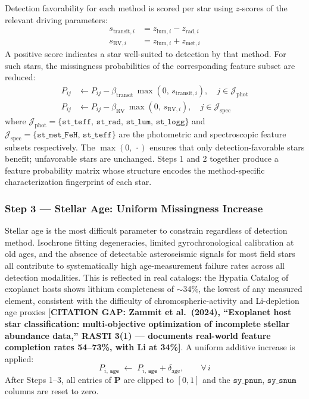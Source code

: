 \documentclass[preprint]{aastex631}
\begin{document}
Detection favorability for each method is scored per star using $z$-scores of the relevant driving parameters:
\begin{align}
  s_{\mathrm{transit},i} &= z_{\mathrm{lum},i} - z_{\mathrm{rad},i} \label{eq:transit-score} \\
  s_{\mathrm{RV},i}      &= z_{\mathrm{lum},i} + z_{\mathrm{met},i} \label{eq:rv-score}
\end{align}
A positive score indicates a star well-suited to detection by that method. For such stars, the missingness probabilities of the corresponding feature subset are reduced:
\begin{align}
  P_{ij} &\leftarrow P_{ij} - \beta_{\mathrm{transit}}\,\max(0,\, s_{\mathrm{transit},i}),
    \quad j \in \mathcal{J}_{\mathrm{phot}} \label{eq:transit-dropout} \\
  P_{ij} &\leftarrow P_{ij} - \beta_{\mathrm{RV}}\,\max(0,\, s_{\mathrm{RV},i}),
    \quad j \in \mathcal{J}_{\mathrm{spec}} \label{eq:rv-dropout}
\end{align}
where $\mathcal{J}_{\mathrm{phot}} = \{\texttt{st\_teff},\, \texttt{st\_rad},\, \texttt{st\_lum},\, \texttt{st\_logg}\}$ and $\mathcal{J}_{\mathrm{spec}} = \{\texttt{st\_met\_FeH},\, \texttt{st\_teff}\}$ are the photometric and spectroscopic feature subsets respectively. The $\max(0,\,\cdot)$ ensures that only detection-favorable stars benefit; unfavorable stars are unchanged. Steps 1 and 2 together produce a feature probability matrix whose structure encodes the method-specific characterization fingerprint of each star.

\subsubsection*{Step 3 --- Stellar Age: Uniform Missingness Increase}

Stellar age is the most difficult parameter to constrain regardless of detection method. Isochrone fitting degeneracies, limited gyrochronological calibration at old ages, and the absence of detectable asteroseismic signals for most field stars all contribute to systematically high age-measurement failure rates across all detection modalities. This is reflected in real catalogs: the Hypatia Catalog of exoplanet hosts shows lithium completeness of $\sim$34\%, the lowest of any measured element, consistent with the difficulty of chromospheric-activity and Li-depletion age proxies \textbf{[CITATION GAP: Zammit et al.\ (2024), ``Exoplanet host star classification: multi-objective optimization of incomplete stellar abundance data,'' RASTI 3(1) --- documents real-world feature completion rates 54--73\%, with Li at 34\%]}. A uniform additive increase is applied:
\begin{equation}
  P_{i,\,\texttt{age}} \;\leftarrow\; P_{i,\,\texttt{age}} + \delta_{\mathrm{age}},
  \qquad \forall\, i \label{eq:age-step}
\end{equation}
After Steps 1--3, all entries of $\mathbf{P}$ are clipped to $[0,1]$ and the $\texttt{sy\_pnum}$, $\texttt{sy\_snum}$ columns are reset to zero.
\end{document}
